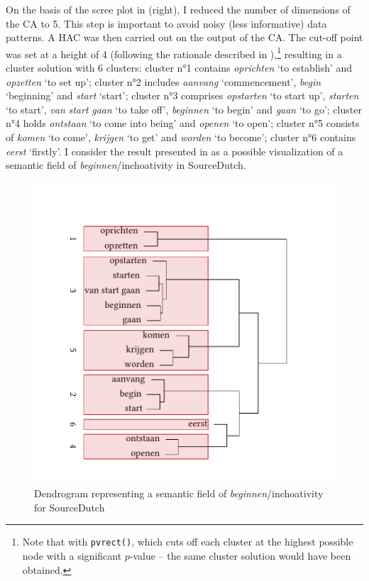 On the basis of the scree plot in  (right), I reduced the number of dimensions of the CA to 5. This step is important to avoid noisy (less informative) data patterns. A HAC was then carried out on the output of the CA. The cut-off point was set at a height of 4 (following the rationale described in ),\footnote{Note that with \texttt{pvrect()}, which cuts off each cluster at the highest possible node with a significant $p$-value – the same cluster solution would have been obtained.} resulting in a cluster solution with 6 clusters: cluster n°1 contains \textit{oprichten} `to establish' and \textit{opzetten} `to set up'; cluster n°2 includes \textit{aanvang} `commencement', \textit{begin} `beginning' and \textit{start} `start'; cluster n°3 comprises \textit{opstarten} `to start up', \textit{starten} `to start', \textit{van} \textit{start} \textit{gaan} `to take off', \textit{beginnen} `to begin' and \textit{gaan} `to go'; cluster n°4 holds \textit{ontstaan} `to come into being' and \textit{openen} `to open'; cluster n°5 consists of \textit{komen} `to come', \textit{krijgen} `to get' and \textit{worden} `to become'; cluster n°6 contains \textit{eerst} `firstly'. I consider the result presented in  as a possible visualization of a semantic field of \textit{beginnen}/inchoativity in SourceDutch.

\begin{figure}  
\includegraphics[width=.75\textwidth,trim=0 20 0 50]{figures/tree52.pdf}
\caption{\label{fig:4:52}  Dendrogram representing a semantic field of \textit{beginnen}/inchoativity for SourceDutch}
\end{figure}

